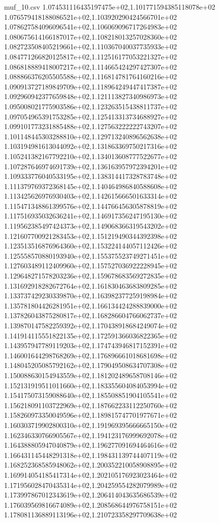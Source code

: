 \begin{filecontents*}{muf_10.csv}
1.074531116435197475e+02,1.101771594385118078e+02
1.076579418188086521e+02,1.103920290424566701e+02
1.078627584096096541e+02,1.106069096717264983e+02
1.080675614166187017e+02,1.108218013257028360e+02
1.082723508405219661e+02,1.110367040037735933e+02
1.084771266820125817e+02,1.112516177053221327e+02
1.086818889418007217e+02,1.114665424297427307e+02
1.088866376205505588e+02,1.116814781764160216e+02
1.090913727189849709e+02,1.118964249447417387e+02
1.092960942377659848e+02,1.121113827340986973e+02
1.095008021775903586e+02,1.123263515438811737e+02
1.097054965391753285e+02,1.125413313734688927e+02
1.099101773231885488e+02,1.127563222222743207e+02
1.101148445303288810e+02,1.129713240896562638e+02
1.103194981613044092e+02,1.131863369750217316e+02
1.105241382167792210e+02,1.134013608777522677e+02
1.107287646974691739e+02,1.136163957972394201e+02
1.109333776040533195e+02,1.138314417328783748e+02
1.111379769372368145e+02,1.140464986840588608e+02
1.113425626976930403e+02,1.142615666501633314e+02
1.115471348861399576e+02,1.144766456305878819e+02
1.117516935032636241e+02,1.146917356247195130e+02
1.119562385497424373e+02,1.149068366319543202e+02
1.121607700921283453e+02,1.151219490344392398e+02
1.123513516876964360e+02,1.153224144057112426e+02
1.125558570880193940e+02,1.155375523749271451e+02
1.127603489112409960e+02,1.157527036922228945e+02
1.129648271578203236e+02,1.159678683569272835e+02
1.131692918282672764e+02,1.161830463683809285e+02
1.133737429230339870e+02,1.163982377259198984e+02
1.135781804426281951e+02,1.166134424288839000e+02
1.137826043875280817e+02,1.168286604766062737e+02
1.139870147582259392e+02,1.170438918684249074e+02
1.141914115551822135e+02,1.172591366036822365e+02
1.143957947789119203e+02,1.174743946817152391e+02
1.146001644298768269e+02,1.176896661018681698e+02
1.148045205085792162e+02,1.179049508634707308e+02
1.150088630154943559e+02,1.181202489658708146e+02
1.152131919511011660e+02,1.183355604084053994e+02
1.154175073159088640e+02,1.185508851904105541e+02
1.156218091103722969e+02,1.187662233112250760e+02
1.158260973350049596e+02,1.189815747701977671e+02
1.160303719902800310e+02,1.191969395666665150e+02
1.162346330766905567e+02,1.194123176999692078e+02
1.164388805947040879e+02,1.196277091694464616e+02
1.166431145448291318e+02,1.198431139744407119e+02
1.168252368585948062e+02,1.200352210058908895e+02
1.169914054185417314e+02,1.202105176923023464e+02
1.171956028470435314e+02,1.204259554282079989e+02
1.173997867012343619e+02,1.206414043635686539e+02
1.176039569816674089e+02,1.208568644976758151e+02
1.178081136889113196e+02,1.210723358297709638e+02

\end{filecontents*}
